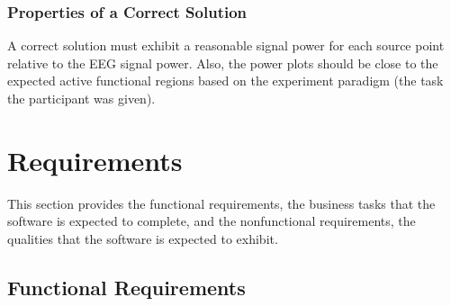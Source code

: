 \documentclass[12pt]{article}
\newcommand{\aref}[1]{A\ref{#1}}
\begin{document}
\subsubsection{Properties of a Correct Solution} \label{sec_CorrectSolution}

\noindent
A correct solution must exhibit a reasonable signal power for each source point relative to the EEG signal power. Also, the power plots should be close to the expected active functional regions based on the experiment paradigm (the task the participant was given).


\section{Requirements}


This section provides the functional requirements, the business tasks that the
software is expected to complete, and the nonfunctional requirements, the
qualities that the software is expected to exhibit.

\subsection{Functional Requirements}
\end{document}
